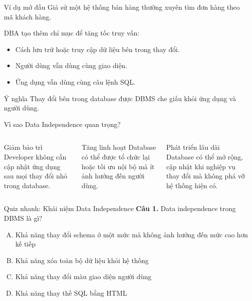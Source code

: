 \documentclass[aspectratio=169,11pt]{beamer}
\begin{document}
\begin{frame}{Ví dụ mở đầu}
Giả sử một hệ thống bán hàng thường xuyên tìm đơn hàng theo mã khách hàng.

\vspace{0.3cm}
DBA tạo thêm chỉ mục để tăng tốc truy vấn:
\begin{itemize}
  \item Cách lưu trữ hoặc truy cập dữ liệu bên trong thay đổi.
  \item Người dùng vẫn dùng cùng giao diện.
  \item Ứng dụng vẫn dùng cùng câu lệnh SQL.
\end{itemize}

\begin{alertblock}{Ý nghĩa}
Thay đổi bên trong database được DBMS che giấu khỏi ứng dụng và người dùng.
\end{alertblock}
\end{frame}

\begin{frame}{Vì sao Data Independence quan trọng?}
\begin{columns}[T]
\begin{block}{Giảm bảo trì}
Developer không cần cập nhật ứng dụng sau mọi thay đổi nhỏ trong database.
\end{block}

\begin{block}{Tăng linh hoạt}
Database có thể được tổ chức lại hoặc tối ưu nội bộ mà ít ảnh hưởng đến người dùng.
\end{block}

\begin{block}{Phát triển lâu dài}
Database có thể mở rộng, cập nhật khi nghiệp vụ thay đổi mà không phá vỡ hệ thống hiện có.
\end{block}
\end{columns}
\end{frame}

\begin{frame}{Quiz nhanh: Khái niệm Data Independence}
\textbf{Câu 1.} Data independence trong DBMS là gì?
\begin{enumerate}[A.]
  \item Khả năng thay đổi schema ở một mức mà không ảnh hưởng đến mức cao hơn kế tiếp
  \item Khả năng xóa toàn bộ dữ liệu khỏi hệ thống
  \item Khả năng thay đổi màu giao diện người dùng
  \item Khả năng thay thế SQL bằng HTML
\end{enumerate}
\end{frame}
\end{document}
